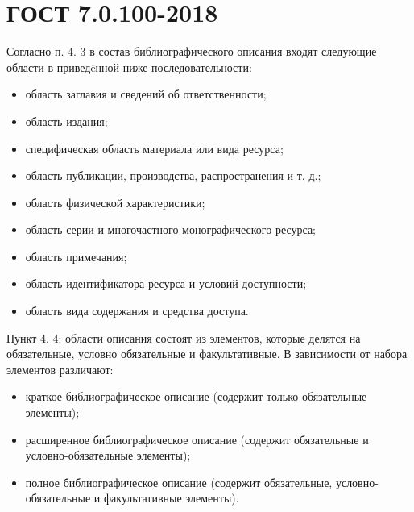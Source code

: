 \chapter{ГОСТ 7.0.100-2018}

Согласно п. 4. 3 в состав библиографического описания входят следующие области в привед\"eнной ниже последовательности:

\begin{itemize}
    \item область заглавия и сведений об ответственности;
    \item область издания;
    \item специфическая область материала или вида ресурса;
    \item область публикации, производства, распространения и т. д.;
    \item область физической характеристики;
    \item область серии и многочастного монографического ресурса;
    \item область примечания;
    \item область идентификатора ресурса и условий доступности;
    \item область вида содержания и средства доступа.
\end{itemize}

Пункт 4. 4: области описания состоят из элементов, которые делятся на обязательные, условно обязательные и факультативные. В зависимости от набора элементов различают:

\begin{itemize}
    \item краткое библиографическое описание (содержит только обязательные элементы);
    \item расширенное библиографическое описание (содержит обязательные и условно-обязательные элементы);
    \item полное библиографическое описание (содержит обязательные, условно-обязательные и факультативные элементы).
\end{itemize}

